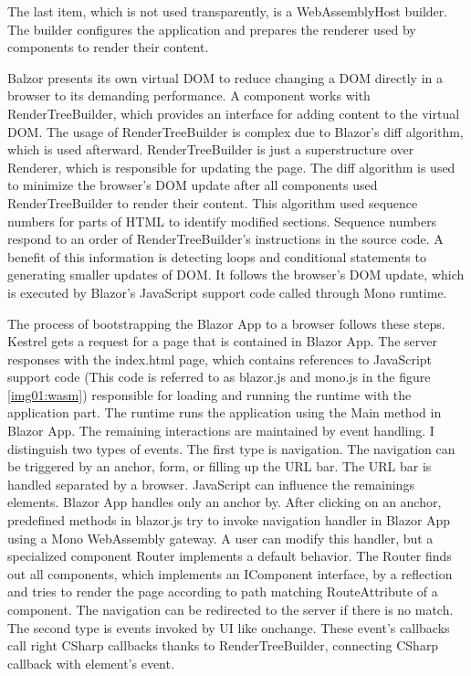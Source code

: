 The last item, which is not used transparently, is a WebAssemblyHost builder.
The builder configures the application and prepares the renderer used by components to render their content.

Balzor presents its own virtual DOM to reduce changing a DOM directly in a browser to its demanding performance.
A component works with RenderTreeBuilder, which provides an interface for adding content to the virtual DOM.
The usage of RenderTreeBuilder is complex due to Blazor's diff algorithm, which is used afterward.
RenderTreeBuilder is just a superstructure over Renderer, which is responsible for updating the page.
The diff algorithm is used to minimize the browser's DOM  update after all components used RenderTreeBuilder to render their content.
This algorithm used sequence numbers for parts of HTML to identify modified sections.
Sequence numbers respond to an order of RenderTreeBuilder's instructions in the source code.
A benefit of this information is detecting loops and conditional statements to generating smaller updates of DOM.  
It follows the browser's DOM update, which is executed by Blazor's JavaScript support code called through Mono runtime.

The process of bootstrapping the Blazor App to a browser follows these steps. 
Kestrel gets a request for a page that is contained in Blazor App. 
The server responses with the index.html page, which contains references to JavaScript support code (This code is referred to as blazor.js and mono.js in the figure \ref{img01:wasm}) responsible for loading and running the runtime with the application part.
The runtime runs the application using the Main method in Blazor App.
The remaining interactions are maintained by event handling.
I distinguish two types of events.
The first type is navigation.
The navigation  can be triggered by an anchor, form, or filling up the URL bar.
The URL bar is handled separated by a browser.
JavaScript can influence the remainings elements.
Blazor App handles only an anchor by.
After clicking on an anchor, predefined methods in blazor.js try to invoke navigation handler in Blazor App using a Mono WebAssembly gateway.
A user can modify this handler, but a specialized component Router implements a default behavior.
The Router finds out all components, which implements an IComponent interface, by a reflection and tries to render the page according to path matching RouteAttribute of a component.
The navigation can be redirected to the server if there is no match.
The second type is events invoked by UI like onchange. These event's callbacks call right CSharp callbacks thanks to RenderTreeBuilder, connecting CSharp callback with element's event.


